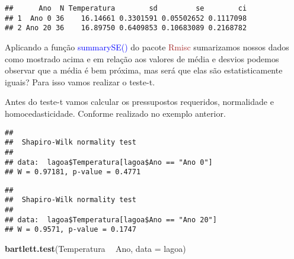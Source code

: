 \documentclass[14pt,titlepage, oneside, openany, a4paper]{book}
\newenvironment{Shaded}{\begin{snugshade}}{\end{snugshade}}
\newcommand{\DataTypeTok}[1]{\textcolor[rgb]{0.13,0.29,0.53}{#1}}
\newcommand{\KeywordTok}[1]{\textcolor[rgb]{0.13,0.29,0.53}{\textbf{#1}}}
\newcommand{\NormalTok}[1]{#1}
\newcommand{\OperatorTok}[1]{\textcolor[rgb]{0.81,0.36,0.00}{\textbf{#1}}}
\newcommand{\StringTok}[1]{\textcolor[rgb]{0.31,0.60,0.02}{#1}}
\begin{document}
\begin{verbatim}
##      Ano  N Temperatura        sd         se        ci
## 1  Ano 0 36    16.14661 0.3301591 0.05502652 0.1117098
## 2 Ano 20 36    16.89750 0.6409853 0.10683089 0.2168782
\end{verbatim}

Aplicando a função \textcolor{blue}{summarySE()} do pacote \textcolor{brown}{Rmisc} sumarizamos nossos dados como mostrado acima e em relação aos valores de média e desvios podemos observar que a média é bem próxima, mas será que elas são estatisticamente iguais? Para isso vamos realizar o teste-t.

Antes do teste-t vamos calcular os pressupostos requeridos, normalidade e homocedasticidade. Conforme realizado no exemplo anterior.

\begin{Shaded}
\end{Shaded}

\begin{verbatim}
## 
##  Shapiro-Wilk normality test
## 
## data:  lagoa$Temperatura[lagoa$Ano == "Ano 0"]
## W = 0.97181, p-value = 0.4771
\end{verbatim}

\begin{Shaded}
\end{Shaded}

\begin{verbatim}
## 
##  Shapiro-Wilk normality test
## 
## data:  lagoa$Temperatura[lagoa$Ano == "Ano 20"]
## W = 0.9571, p-value = 0.1747
\end{verbatim}

\begin{Shaded}
\begin{Highlighting}[]
\KeywordTok{bartlett.test}\NormalTok{(Temperatura }\OperatorTok{~}\StringTok{ }\NormalTok{Ano, }\DataTypeTok{data =}\NormalTok{ lagoa)}
\end{Highlighting}
\end{Shaded}
\end{document}
